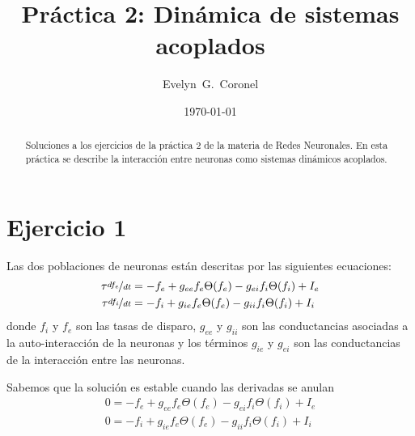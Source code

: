 



\title{Práctica 2: Dinámica de sistemas acoplados }
\author{Evelyn~G.~Coronel}


\date[]{\lowercase{\today}} %

\begin{abstract}
Soluciones a los ejercicios de la práctica 2 de la materia de Redes Neuronales. En esta práctica se describe  la interacción entre neuronas como sistemas dinámicos acoplados.
\end{abstract} 
\maketitle
%


\section*{Ejercicio 1}

Las dos poblaciones de neuronas están descritas por las siguientes ecuaciones:
\begin{align}
    \tau \nicefrac{df_e}{dt} &= -f_e + g_{ee} f_e\Theta(f_e) - g_{ei}f_i\Theta(f_i) + I_e\\
    \tau \nicefrac{df_i}{dt} &= -f_i + g_{ie} f_e\Theta(f_e) - g_{ii}f_i\Theta(f_i) + I_i
\end{align}
donde $f_i$ y $f_e$ son las tasas de disparo, $g_{ee}$ y $g_{ii}$ son las conductancias asociadas a la auto-interacción de la neuronas y los términos $g_{ie}$ y $g_{ei}$ son las conductancias de la interacción entre las neuronas.

Sabemos que la solución es estable cuando las derivadas se anulan
\begin{align}
    0= -f_e + g_{ee} f_e\Theta(f_e) - g_{ei}f_i\Theta(f_i) + I_e\\
    0= -f_i + g_{ie} f_e\Theta(f_e) - g_{ii}f_i\Theta(f_i) + I_i
\end{align}

